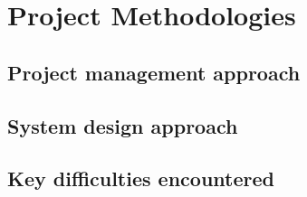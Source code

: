 
\chapter{Project Methodologies}\label{C:m}

\section{Project management approach}

\section{System design approach}

\section{Key difficulties encountered}